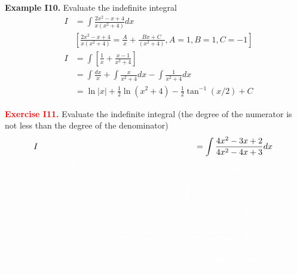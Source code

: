 \documentclass{article}
\begin{document}
\textbf{Example I10.} Evaluate  the indefinite integral
\begin{eqnarray}
& I & =\int  \frac{2x^2 -x + 4} { x(x^2+4) } dx \; \;  \nonumber\\
& &  \left[ \frac{2x^2 -x + 4} { x(x^2+4)}=\frac{A} { x}+
\frac{Bx+C} {(x^2+4)},
A=1, B=1, C=-1 \right]   \nonumber \\
& I  & =\int \left[ \frac{1} {x}  + \frac{x-1} {x^2 +4 } \right]  \nonumber \\
&   & =\int  \frac{dx} {x} +  \int  \frac{x} {x^2 +4 } dx -\int  \frac{1} {x^2 +4 } dx  \nonumber \\
&   & = \ln |x| +\frac{1}{2} \ln (x^2 +4) - \frac{1}{2} \tan^{-1}(x/2)+C  \nonumber
\end{eqnarray}


\textcolor{red}{\textbf{Exercise I11.}} Evaluate the indefinite integral (the
degree of the numerator is not less than the degree of the
denominator)
\begin{eqnarray}
& I & =\int  \frac{4x^2 -3x + 2} { 4x^2 -4x +3 } dx \; \;  \nonumber\\
& &  \textcolor{white}{\displaystyle \frac{4x^2 -3x + 2} { 4x^2 -4x +3 }=1+\frac{x-1} { 4x^2 -4x +3 }; 4x^2 -4x +3=( 2x -1)^2 +2}   \nonumber \\
&   & \textcolor{white}{\int \left[ 1+ \frac{x-1} {(2x-1)^2+2 } \right]dx } \nonumber \\
&    & \textcolor{white}{= x+ \int \left[ \frac{ (1/2)(2x-1)-(1/2) } {(2x-1)^2+2 } \right] (1/2) d(2x-1)  } \nonumber \\
&    & \textcolor{white}{=x+\int  \left(\frac{1}{4}  \frac{(2x-1)} {(2x-1)^2+2 } - \frac{1}{4}  \frac{1} {(2x-1)^2+2 } \right)  d(2x-1)}
  \nonumber \\
& & \textcolor{white}{=x+  \frac{1}{8}  \ln[(2x-1)^2+2] -  \frac{1}{4 \sqrt{2}}
\tan^{-1} \frac{2x-1}{ \sqrt{2}} +C  } \nonumber
\end{eqnarray}

%
%
\end{document}
